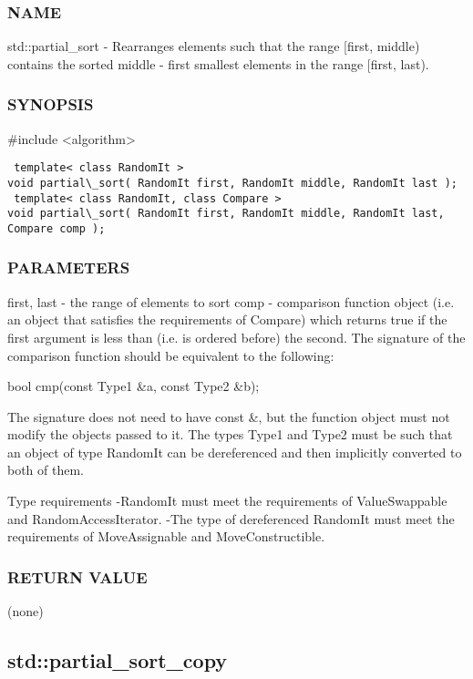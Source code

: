 \subsubsection{NAME}
std::partial\_sort - Rearranges elements such that the range [first, middle) contains the sorted middle - first smallest elements in the range [first, last).

\subsubsection{SYNOPSIS}
\#include <algorithm>

\begin{lstlisting}
 template< class RandomIt >
void partial\_sort( RandomIt first, RandomIt middle, RandomIt last );
 template< class RandomIt, class Compare >
void partial\_sort( RandomIt first, RandomIt middle, RandomIt last, Compare comp );
\end{lstlisting}

\subsubsection{PARAMETERS}
first, last - the range of elements to sort
comp - comparison function object (i.e. an object that satisfies the requirements of Compare) which returns true if the first argument is less than (i.e. is ordered before) the second.
The signature of the comparison function should be equivalent to the following:

 bool cmp(const Type1 \&a, const Type2 \&b);

The signature does not need to have const \&, but the function object must not modify the objects passed to it.
The types Type1 and Type2 must be such that an object of type RandomIt can be dereferenced and then implicitly converted to both of them.

 Type requirements
 -RandomIt must meet the requirements of ValueSwappable and RandomAccessIterator.
 -The type of dereferenced RandomIt must meet the requirements of MoveAssignable and MoveConstructible.

\subsubsection{RETURN VALUE}
(none)



\subsection{std::partial\_sort\_copy}

